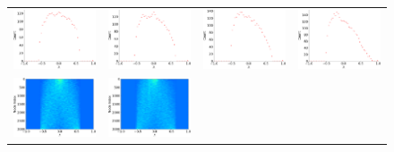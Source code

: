 \documentclass[senior,final,11pt]{iscs-thesis}
\begin{document}
\begin{figure}[htbp]
  \setlength\tabcolsep{0pt}
  \hspace{-3.0cm}
  \begin{tabular}{cccc}
    \includegraphics[width=45mm]{figure/powerlaw_cluster_graph_n3000_m5_p01txt_dos.png} &
    \includegraphics[width=45mm]{figure/powerlaw_cluster_graph_n3000_m5_p03txt_dos.png} &
    \includegraphics[width=45mm]{figure/powerlaw_cluster_graph_n3000_m5_p05txt_dos.png} &
    \includegraphics[width=45mm]{figure/powerlaw_cluster_graph_n3000_m5_p08txt_dos.png} \\
    \includegraphics[width=45mm]{figure/powerlaw_cluster_graph_n3000_m5_p01txt_pdos.png} &
    \includegraphics[width=45mm]{figure/powerlaw_cluster_graph_n3000_m5_p03txt_pdos.png} &

\end{tabular}
\end{figure}
\end{document}
